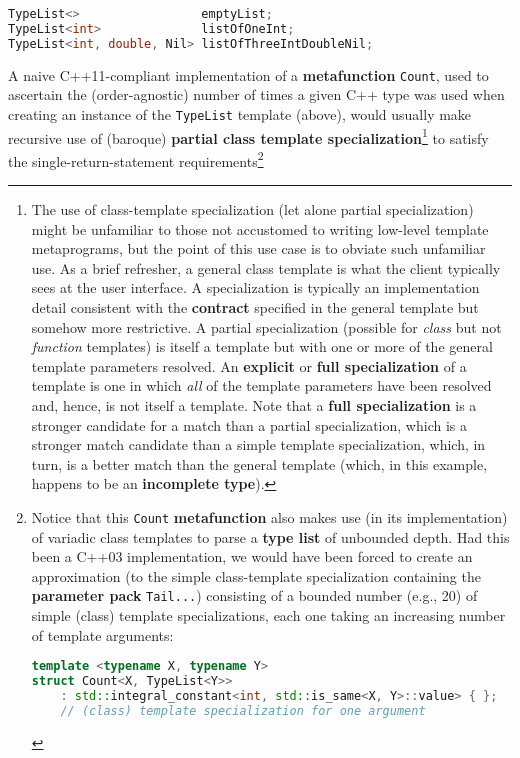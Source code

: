 \begin{lstlisting}[language=C++]
TypeList<>                 emptyList;
TypeList<int>              listOfOneInt;
TypeList<int, double, Nil> listOfThreeIntDoubleNil;
\end{lstlisting}

\noindent A naive C++11-compliant implementation of a \textbf{metafunction}
\texttt{Count}, used to ascertain the (order-agnostic) number of times a
given C++ type was used when creating an instance of the
\texttt{TypeList} template (above), would usually make recursive use of
(baroque) \textbf{partial class template
specialization}{\cprotect\footnote{The use of class-template
specialization (let alone partial specialization) might be unfamiliar
to those not accustomed to writing low-level template metaprograms, but the point of this use case is to obviate such
unfamiliar use. As a brief refresher, a general class template is what
the client typically sees at the user interface. A specialization is
typically an implementation detail consistent with the
\textbf{contract} specified in the general template but somehow more
restrictive. A partial specialization (possible for \emph{class} but
not \emph{function} templates) is itself a template but with one or
more of the general template parameters resolved. An \textbf{explicit}
or \textbf{full specialization} of a template is one in which
\emph{all} of the template parameters have been resolved and, hence, is
not itself a template. Note that a \textbf{full specialization} is a
stronger candidate for a match than a partial specialization, which is
a stronger match candidate than a simple template specialization,
which, in turn, is a better match than the general template (which, in
  this example, happens to be an \textbf{incomplete type}).}} to satisfy the single-return-statement requirements{\cprotect\footnote{Notice that this \texttt{Count}
\textbf{metafunction} also makes use (in its implementation) of
variadic class templates to parse a \textbf{type list} of unbounded
depth. Had this been a C++03 implementation, we would have been forced
to create an approximation (to the simple class-template
specialization containing the \textbf{parameter pack}
\texttt{Tail...}) consisting of a bounded number (e.g., 20) of simple
(class) template specializations, each one taking an increasing number
of template arguments:

\begin{lstlisting}[language=C++, basicstyle={\ttfamily\footnotesize}]
template <typename X, typename Y>
struct Count<X, TypeList<Y>>
    : std::integral_constant<int, std::is_same<X, Y>::value> { };
    // (class) template specialization for one argument


\end{lstlisting}}}

